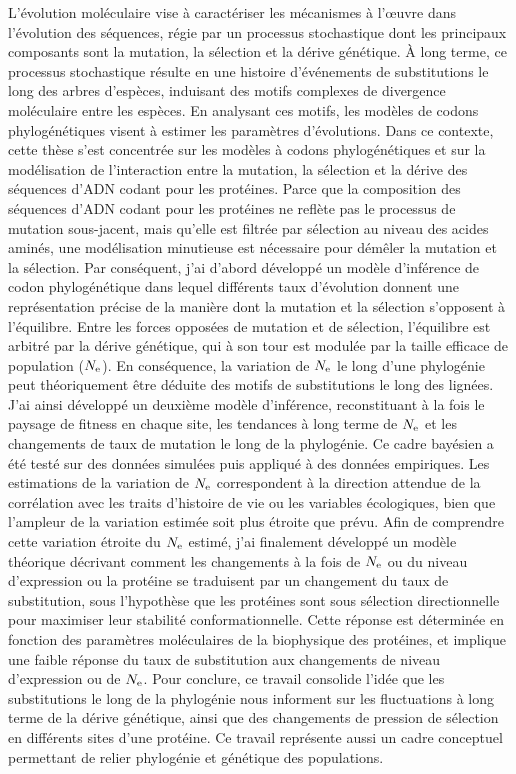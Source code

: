 L'évolution moléculaire vise à caractériser les mécanismes à l'œuvre dans l'évolution des séquences, régie par un processus stochastique dont les principaux composants sont la mutation, la sélection et la dérive génétique.
À long terme, ce processus stochastique résulte en une histoire d'événements de substitutions le long des arbres d'espèces, induisant des motifs complexes de divergence moléculaire entre les espèces.
En analysant ces motifs, les modèles de codons phylogénétiques visent à estimer les paramètres d'évolutions.
Dans ce contexte, cette thèse s'est concentrée sur les modèles à codons phylogénétiques et sur la modélisation de l'interaction entre la mutation, la sélection et la dérive des séquences d'ADN codant pour les protéines.
Parce que la composition des séquences d'ADN codant pour les protéines ne reflète pas le processus de mutation sous-jacent, mais qu'elle est filtrée par sélection au niveau des acides aminés, une modélisation minutieuse est nécessaire pour démêler la mutation et la sélection.
Par conséquent, j'ai d'abord développé un modèle d'inférence de codon phylogénétique dans lequel différents taux d'évolution donnent une représentation précise de la manière dont la mutation et la sélection s'opposent à l'équilibre.
Entre les forces opposées de mutation et de sélection, l'équilibre est arbitré par la dérive génétique, qui à son tour est modulée par la taille efficace de population ($N_{\textrm{e}}$).
En conséquence, la variation de $N_{\textrm{e}}$ le long d'une phylogénie peut théoriquement être déduite des motifs de substitutions le long des lignées.
J'ai ainsi développé un deuxième modèle d'inférence, reconstituant à la fois le paysage de fitness en chaque site, les tendances à long terme de $N_{\textrm{e}}$ et les changements de taux de mutation le long de la phylogénie.
Ce cadre bayésien a été testé sur des données simulées puis appliqué à des données empiriques.
Les estimations de la variation de $N_{\textrm{e}}$ correspondent à la direction attendue de la corrélation avec les traits d’histoire de vie ou les variables écologiques, bien que l'ampleur de la variation estimée soit plus étroite que prévu.
Afin de comprendre cette variation étroite du $N_{\textrm{e}}$ estimé, j'ai finalement développé un modèle théorique décrivant comment les changements à la fois de $N_{\textrm{e}}$ ou du niveau d'expression ou la protéine se traduisent par un changement du taux de substitution, sous l'hypothèse que les protéines sont sous sélection directionnelle pour maximiser leur stabilité conformationnelle.
Cette réponse est déterminée en fonction des paramètres moléculaires de la biophysique des protéines, et implique une faible réponse du taux de substitution aux changements de niveau d'expression ou de $N_{\textrm{e}}$.
Pour conclure, ce travail consolide l'idée que les substitutions le long de la phylogénie nous informent sur les fluctuations à long terme de la dérive génétique, ainsi que des changements de pression de sélection en différents sites d'une protéine.
Ce travail représente aussi un cadre conceptuel permettant de relier phylogénie et génétique des populations.



